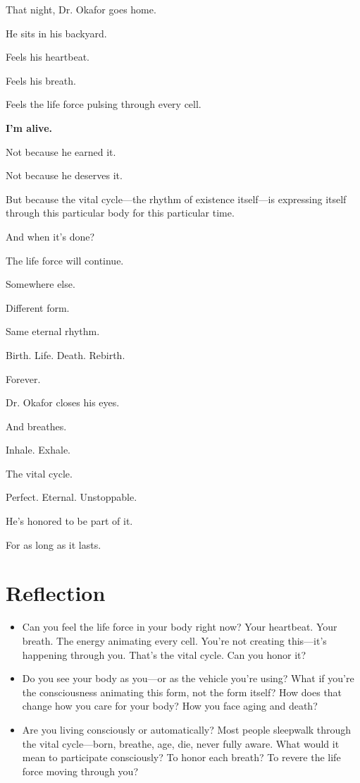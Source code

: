 \documentclass[11pt,twoside]{book}
\begin{document}
That night, Dr. Okafor goes home.

He sits in his backyard.

Feels his heartbeat.

Feels his breath.

Feels the life force pulsing through every cell.

\textbf{I'm alive.}

Not because he earned it.

Not because he deserves it.

But because the vital cycle—the rhythm of existence itself—is expressing itself through this particular body for this particular time.

And when it's done?

The life force will continue.

Somewhere else.

Different form.

Same eternal rhythm.

Birth. Life. Death. Rebirth.

Forever.

Dr. Okafor closes his eyes.

And breathes.

Inhale. Exhale.

The vital cycle.

Perfect. Eternal. Unstoppable.

He's honored to be part of it.

For as long as it lasts.

\section*{Reflection}

\begin{itemize}
\item Can you feel the life force in your body right now? Your heartbeat. Your breath. The energy animating every cell. You're not creating this—it's happening through you. That's the vital cycle. Can you honor it?
\item Do you see your body as you—or as the vehicle you're using? What if you're the consciousness animating this form, not the form itself? How does that change how you care for your body? How you face aging and death?
\item Are you living consciously or automatically? Most people sleepwalk through the vital cycle—born, breathe, age, die, never fully aware. What would it mean to participate consciously? To honor each breath? To revere the life force moving through you?
\end{itemize}
\end{document}

